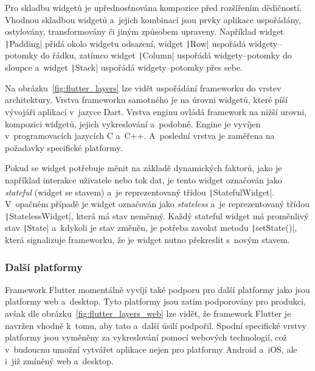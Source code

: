 Pro skladbu widgetů je upřednosťnována kompozice před rozšířením dědičností.
Vhodnou skladbou widgetů a~jejich kombinací jsou prvky aplikace uspořádány,
ostylovány, transformovány či jiným způsobem upraveny.
Například widget \texttt|Padding| přidá okolo widgetu odsazení,
widget \texttt|Row| uspořádá widgety--potomky do řádku,
zatímco widget \texttt|Column| uspořádá widgety--potomky
do sloupce a~widget \texttt|Stack| uspořádá widgety--potomky
přes sebe.~\cite{flutter_technical_overview}\pagebreak

Na obrázku~\ref{fig:flutter_layers} lze vidět uspořádání frameworku do vrstev
architektury.
Vrstva frameworku samotného je na úrovni widgetů,
které píší vývojáři aplikací v~jazyce Dart.
Vrstva enginu ovládá framework na nižší urovni, kompozici widgetů,
jejich vykreslování a~podobně.
Engine je vyvíjen v~programovacích jazycích C a~C++.
A~poslední vrstva je zaměřena na požadavky specifické
platformy.~\cite{flutter_technical_overview}

Pokud se widget potřebuje měnit na základě dynamických faktorů,
jako je například interakce uživatele nebo tok dat,
je tento widget označován jako \emph{stateful} (widget se stavem) a~je
reprezentovaný třídou \texttt|StatefulWidget|.
V~opačném případě je widget označován jako \emph{stateless} a~je 
reprezentovaný třídou \texttt|StatelessWidget|,
která má stav neměnný.
Každý stateful widget má proměnlivý stav \texttt|State|
a~kdykoli je stav změněn,
je potřeba zavolat metodu \texttt|setState()|,
která signalizuje frameworku,
že je widget nutno překreslit s~novým stavem.~\cite{flutter_technical_overview}

\subsubsection*{Další platformy}

Framework Flutter momentálně vyvíjí také podporu pro
další platformy jako jsou platformy web a~desktop.
Tyto platformy jsou zatím podporovány pro produkci,
avšak dle obrázku~\ref{fig:flutter_layers_web} lze vidět,
že framework Flutter je navržen vhodně k~tomu,
aby tato a~další úsilí podpořil.
Spodní specifické vrstvy platformy jsou vyměněny za vykreslování pomocí
webových technologií,
což v~budoucnu umožní vytvářet aplikace nejen pro platformy Android a~iOS,
ale i~již zmíněný web a~desktop.~\cite{flutter_web, flutter_desktop} 

